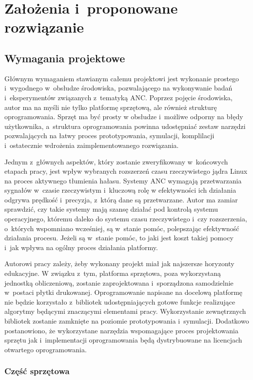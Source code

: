 \chapter{Założenia i~proponowane rozwiązanie}

\section{Wymagania projektowe}

Głównym wymaganiem stawianym całemu projektowi jest wykonanie prostego
i~wygodnego w~obsłudze środowiska, pozwalającego na wykonywanie badań
i~eksperymentów związanych z~tematyką ANC. Poprzez pojęcie środowiska, autor ma
na myśli nie tylko platformę sprzętową, ale również strukturę oprogramowania.
Sprzęt ma być prosty w obsłudze i~możliwe odporny na błędy użytkownika,
a~struktura oprogramowania powinna udostępniać zestaw narzędzi pozwalających na
łatwy proces prototypowania, symulacji, komplilacji i~ostatecznie wdrożenia
zaimplementowanego rozwiązania. \par Jednym z~głównych aspektów, który zostanie
zweryfikowany w~końcowych etapach pracy, jest wpływ wybranych rozszerzeń czasu
rzeczywistego jądra Linux na proces aktywnego tłumienia hałasu. Systemy ANC
wymagają przetwarzania sygnałów w~czasie rzeczywistym i~kluczową rolę w
efektywności ich działania odgrywa prędkość i~precyzja, z~którą dane są
przetwarzane. Autor ma zamiar sprawdzić, czy takie systemy mają szansę działać
pod kontrolą systemu operacyjnego, któremu daleko do systemu czasu rzeczywistego
i~czy rozszerzenia, o~których wspomniano wcześniej, są w~stanie pomóc,
polepszając efektywność działania procesu. Jeżeli są w~stanie pomóc, to jaki
jest koszt takiej pomocy i~jak wpływa na ogólny proces działania platformy. \par
Autorowi pracy zależy, żeby wykonany projekt miał jak najszersze horyzonty
edukacyjne. W związku z~tym, platforma sprzętowa, poza wykorzystaną jednostką
obliczeniową, zostanie zaprojektowana i~sporządzona samodzielnie w~postaci
płytki drukowanej. Oprogramowanie napisane na docelową platformę nie będzie
korzystało z~bibliotek udostępniających gotowe funkcje realizujące algorytmy
będącymi znaczącymi elementami pracy. Wykorzystanie zewnętrznych bibliotek
zostanie zamknięte na poziomie prototypowania i~symulacji. Dodatkowo
postanowiono, że wykorzystane narzędzia wspomagające proces projektowania
sprzętu jak i~implementacji oprogramowania będą dystrybuowane na licencjach
otwartego oprogramowania.

\subsection{Część sprzętowa}

